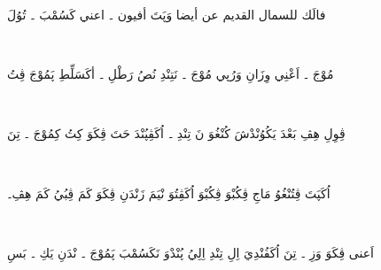 \documentclass[a4paper, 12pt]{report}
\begin{document}
\begin{flushright}

{\textarabic{فالَك للسمال القديم عن أيضا وَپَتَ أفيون ۔ اعني كَسُمْبَ ۔ تُوُلَ} \\ 

 \vspace{10mm} 

 \\ 

 \vspace{10mm} 

{\textarabic{مُوْجَ ۔ اَعْنِي وِزَانِ وَرُپي مُوْجَ ۔ نَتِنْدِ نُصُ رَطْلِ ۔ أكَسَلِّطِ پَمُوْجَ ڤِتُ} \\ 

 \vspace{10mm} 

 \\ 

 \vspace{10mm} 

{\textarabic{ڤِوِلِ هِڤِ بَعْدَ يَكُوُنْدْشَ كُنْغُوَ نَ تِنْدِ ۔ اُكَڤِپُنْدَ حَتَ ڤِكَوَ كِتُ كِمُوْجَ ۔ تِنَ} \\ 

 \vspace{10mm} 

 \\ 

 \vspace{10mm} 

{\textarabic{اُكَپَتَ ڤِتُنْغُوُ مَاجِ ڤِكُبْوَ ڤِكُبْوَ اُكَڤِتُوَ نْيَمَ زَنْدَنِ ڤِكَوَ كَمَ ڤِبُيُ كَمَ هِڤِ۔} \\ 

 \vspace{10mm} 

 \\ 

 \vspace{10mm} 

{\textarabic{اَعنى ڤِكَوَ وَزِ ۔ تِنَ اُكَفُنْدِيَ اِلِ تِنْدِ اِلِيُ پُنْدْوَ نَكَسُمْبَ پَمُوْجَ ۔ نْدَنِ يَكِ ۔ بَسِ} \\ 

 \vspace{10mm} 

}}}}}
\end{flushright}
\end{document}

